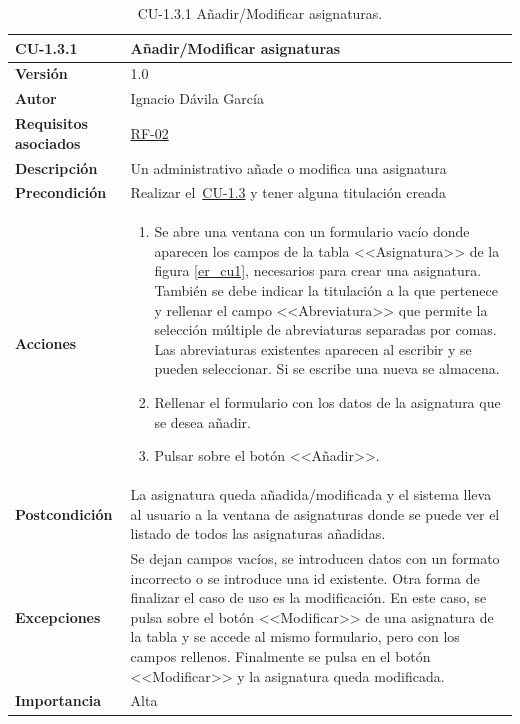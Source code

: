 \begin{table}[p]
\label{table:CU-1.3.1}
	\centering
	\begin{tabularx}{\linewidth}{ p{} p{} }
		\toprule
		\textbf{CU-1.3.1}    & \textbf{Añadir/Modificar asignaturas}\\
		\toprule
		\textbf{Versión}              & 1.0    \\
		\textbf{Autor}                & Ignacio Dávila García \\
		\textbf{Requisitos asociados} & \hyperref[itm:RF2]{RF-02} \\
		\textbf{Descripción}          & Un administrativo añade o modifica una asignatura \\
		\textbf{Precondición}         & Realizar el~\hyperref[table:CU-1.3]{CU-1.3} y tener alguna titulación creada \\
		\textbf{Acciones}             &
		\begin{enumerate}
			\def\labelenumi{\arabic{enumi}.}
			\tightlist
			\item Se abre una ventana con un formulario vacío donde aparecen los campos de la tabla <<Asignatura>> de la figura \ref{er_cu1}, necesarios para crear una asignatura. También se debe indicar la titulación a la que pertenece y rellenar el campo <<Abreviatura>> que permite la selección múltiple de abreviaturas separadas por comas. Las abreviaturas existentes aparecen al escribir y se pueden seleccionar. Si se escribe una nueva se almacena.
			\item Rellenar el formulario con los datos de la asignatura que se desea añadir.
			\item Pulsar sobre el botón <<Añadir>>.
		\end{enumerate}\\
		\textbf{Postcondición}        & La asignatura queda añadida/modificada y el sistema lleva al usuario a la ventana de asignaturas donde se puede ver el listado de todos las asignaturas añadidas. \\
		\textbf{Excepciones}          & Se dejan campos vacíos, se introducen datos con un formato incorrecto o se introduce una id existente. Otra forma de finalizar el caso de uso es la modificación. En este caso, se pulsa sobre el botón <<Modificar>> de una asignatura de la tabla y se accede al mismo formulario, pero con los campos rellenos. Finalmente se pulsa en el botón <<Modificar>> y la asignatura queda modificada. \\
		\textbf{Importancia}          & Alta \\
		\bottomrule
	\end{tabularx}
	\caption{CU-1.3.1 Añadir/Modificar asignaturas.}
\end{table}
\FloatBarrier

